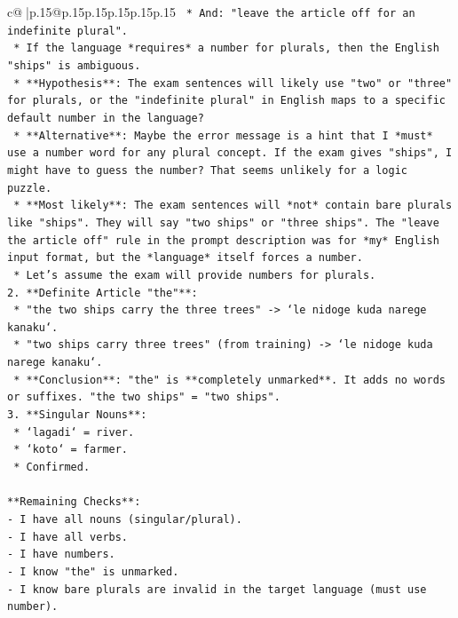 \documentclass{article}
\begin{document}
{\begin{supertabular}{c@{$\;$}|p{.15\linewidth}@{}p{.15\linewidth}p{.15\linewidth}p{.15\linewidth}p{.15\linewidth}p{.15\linewidth}}
{{{\texttt{    *   And: "leave the article off for an indefinite plural".} \\
\texttt{    *   If the language *requires* a number for plurals, then the English "ships" is ambiguous.} \\
\texttt{    *   **Hypothesis**: The exam sentences will likely use "two" or "three" for plurals, or the "indefinite plural" in English maps to a specific default number in the language?} \\
\texttt{    *   **Alternative**: Maybe the error message is a hint that I *must* use a number word for any plural concept. If the exam gives "ships", I might have to guess the number? That seems unlikely for a logic puzzle.} \\
\texttt{    *   **Most likely**: The exam sentences will *not* contain bare plurals like "ships". They will say "two ships" or "three ships". The "leave the article off" rule in the prompt description was for *my* English input format, but the *language* itself forces a number.} \\
\texttt{    *   Let's assume the exam will provide numbers for plurals.} \\
\texttt{2.  **Definite Article "the"**:} \\
\texttt{    *   "the two ships carry the three trees" {-}> `le nidoge kuda narege kanaku`.} \\
\texttt{    *   "two ships carry three trees" (from training) {-}> `le nidoge kuda narege kanaku`.} \\
\texttt{    *   **Conclusion**: "the" is **completely unmarked**. It adds no words or suffixes. "the two ships" = "two ships".} \\
\texttt{3.  **Singular Nouns**:} \\
\texttt{    *   `lagadi` = river.} \\
\texttt{    *   `koto` = farmer.} \\
\texttt{    *   Confirmed.} \\
\\ 
\texttt{**Remaining Checks**:} \\
\texttt{{-} I have all nouns (singular/plural).} \\
\texttt{{-} I have all verbs.} \\
\texttt{{-} I have numbers.} \\
\texttt{{-} I know "the" is unmarked.} \\
\texttt{{-} I know bare plurals are invalid in the target language (must use number).} \\
}}}
\end{supertabular}}
\end{document}
